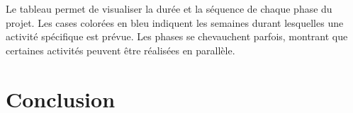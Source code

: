 Le tableau permet de visualiser la durée et la séquence de chaque phase du projet. Les cases colorées en bleu indiquent les semaines durant lesquelles une activité spécifique est prévue. Les phases se chevauchent parfois, montrant que certaines activités peuvent être réalisées en parallèle.



















\section{Conclusion}
